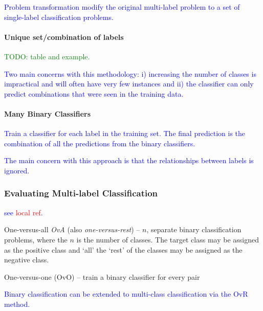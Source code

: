 \textcolor{blue}{{Problem transformation} modify the original multi-label problem to a set of single-label classification problems.}

\paragraph{Unique set/combination of labels}

\textcolor{green}{TODO: table and example.}

\textcolor{blue}{Two main concerns with this methodology: i) increasing the number of classes is impractical and will often have very few instances and ii) the classifier can only predict combinations that were seen in the training data.}

\paragraph{Many Binary Classifiers}

\textcolor{blue}{Train a classifier for each label in the training set. The final prediction is the combination of all the predictions from the binary classifiers.}

\textcolor{blue}{The main concern with this approach is that the relationships between labels is ignored.}

\subsubsection{Evaluating Multi-label Classification}

\textcolor{blue}{see \textcolor{red}{local ref}.}

One-versus-all \emph{OvA} (also \emph{one-versus-rest}) -- $n$, separate binary classification problems, where the $n$ is the number of classes. The target class may be assigned as the positive class and `all' the `rest' of the classes may be assigned as the negative class.

One-versus-one (OvO) -- train a binary classifier for every pair


\textcolor{blue}{Binary classification can be extended to multi-class classification via the OvR method.}


